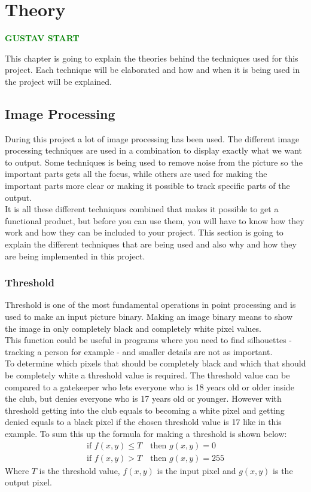 \chapter{Theory}
\textbf{\textcolor{green}{GUSTAV START}}

This chapter is going to explain the theories behind the techniques used for this project. Each technique will be elaborated and how and when it is being used in the project will be explained.
\section{Image Processing}
During this project a lot of image processing has been used. The different image processing techniques are used in a combination to display exactly what we want to output. Some techniques is being used to remove noise from the picture so the important parts gets all the focus, while others are used for making the important parts more clear or making it possible to track specific parts of the output. \\
It is all these different techniques combined that makes it possible to get a functional product, but before you can use them, you will have to know how they work and how they can be included to your project. This section is going to explain the different techniques that are being used and also why and how they are being implemented in this project.
\subsection{Threshold}
Threshold is one of the most fundamental operations in point processing and is used to make an input picture binary. Making an image binary means to show the image in only completely black and completely white pixel values. \\
This function could be useful in programs where you need to find silhouettes - tracking a person for example - and smaller details are not as important. \\
To determine which pixels that should be completely black and which that should be completely white a threshold value is required. The threshold value can be compared to a gatekeeper who lets everyone who is 18 years old or older inside the club, but denies everyone who is 17 years old or younger. However with threshold getting into the club equals to becoming a white pixel and getting denied equals to a black pixel if the chosen threshold value is 17 like in this example. To sum this up the formula for making a threshold is shown below:
\begin{equation}
  \begin{aligned}
  	\text{if } f(x,y)\leq T \quad \text{then } g(x,y)=0 \\
  	\text{if } f(x,y)>T \quad \text{then } g(x,y)=255
  \end{aligned} 
\end{equation}
Where $T$ is the threshold value, $f(x,y)$ is the input pixel and $g(x,y)$ is the output pixel. 

